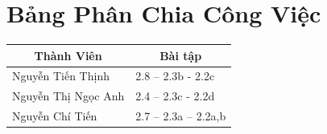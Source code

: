 \section*{Bảng Phân Chia Công Việc}
\begin{table}[h]
\centering
\renewcommand{\arraystretch}{1.5} %
\begin{tabular}{|l|l|}
\hline
\multicolumn{1}{|c|}{\textbf{Thành Viên}} & \multicolumn{1}{c|}{\textbf{Bài tập}} \\ \hline
Nguyễn Tiến Thịnh  & 2.8 -- 2.3b - 2.2c                      \\ \hline
Nguyễn Thị Ngọc Anh & 2.4 -- 2.3c - 2.2d                      \\ \hline
Nguyễn Chí Tiến    & 2.7 -- 2.3a -- 2.2a,b                   \\ \hline
\end{tabular}
\end{table}
